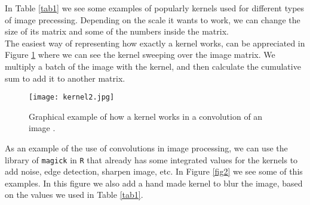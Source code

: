 \documentclass{article}
\begin{document}
In Table \ref{tab1} we see some examples of popularly kernels used for different types of image precessing. Depending on the scale it wants to work, we can change the size of its matrix and some of the numbers inside the matrix. \\

The easiest way of representing how exactly a kernel works, can be appreciated in Figure \ref{fig1} where we can see the kernel sweeping over the image matrix. We multiply a batch of the image with the kernel, and then calculate the cumulative sum to add it to another matrix.\\

\begin{figure}[]
  \centering
  \texttt{[image: kernel2.jpg]}  
	\caption{Graphical example of how a kernel works in a convolution of an image \cite{stda}.}
\label{fig1}
\end{figure}

As an example of the use of convolutions in image processing, we can use the library of \texttt{magick} \cite{magik} in \texttt{R} that already has some integrated values for the kernels to add noise, edge detection, sharpen image, etc. In Figure \ref{fig2} we see some of this examples. In this figure we also add a hand made kernel to blur the image, based on the values we used in Table \ref{tab1}. \\
\end{document}
